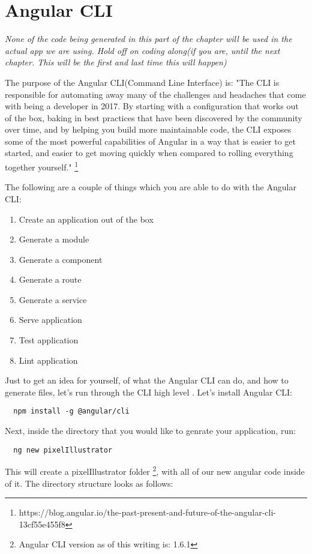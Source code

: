 
\maketitle{}
\section{ Angular CLI }

\textit{None of the code being generated in this part of the chapter will be
used in the actual app we are using. Hold off on coding along(if you are, until
the next chapter. This will be the first and last time this will happen)}

The purpose of the Angular CLI(Command Line Interface) is:
"The CLI is responsible for automating away many of the challenges and headaches
that come with being a developer in 2017. By starting with a configuration that
works out of the box, baking in best practices that have been discovered by the
community over time, and by helping you build more maintainable code, the CLI
exposes some of the most powerful capabilities of Angular in a way that is
easier to get started, and easier to get moving quickly when compared to rolling
everything together yourself." \footnote{https://blog.angular.io/the-past-present-and-future-of-the-angular-cli-13cf55e455f8}

The following are a couple of things which you are able to do with the Angular
CLI:

\begin{enumerate}
  \item Create an application out of the box
  \item Generate a module
  \item Generate a component
  \item Generate a route
  \item Generate a service
  \item Serve application
  \item Test application
  \item Lint application
\end{enumerate}

Just to get an idea for yourself, of what the Angular CLI can do, and how to
generate files, let's run through the CLI high level . Let's install Angular
CLI:
\begin{verbatim}
  npm install -g @angular/cli
\end{verbatim}
Next, inside the directory that you would like to genrate your application, run:
\begin{verbatim}
  ng new pixelIllustrator
\end{verbatim}
This will create a pixelIllustrator folder \footnote{Angular CLI version as of
this writing is: 1.6.1}, with all of our new angular code
inside of it. The directory structure looks as follows:

